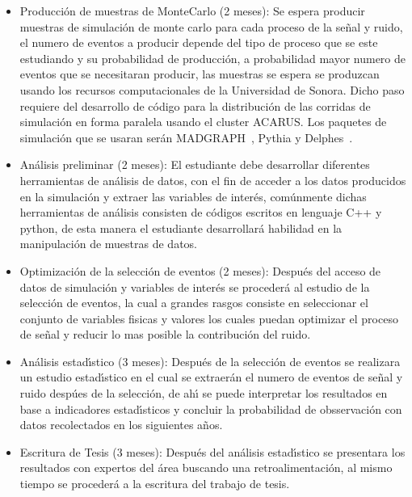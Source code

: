 \begin{itemize}
  
\item Producci\'on de muestras de MonteCarlo (2 meses): Se espera producir muestras de simulaci\'on de monte carlo para cada proceso de la se\~nal y ruido, el numero de eventos a producir depende del tipo de proceso que se este estudiando y su probabilidad de producci\'on, a probabilidad mayor numero de eventos que se necesitaran producir, las muestras se espera se produzcan usando los recursos computacionales de la Universidad de Sonora. Dicho paso requiere del desarrollo de c\'odigo para la distribuci\'on de las corridas de simulaci\'on en forma paralela usando el cluster ACARUS. Los paquetes de simulaci\'on que se usaran ser\'an MADGRAPH~\cite{Alwall:2007st}, Pythia y Delphes~\cite{deFavereau2014}.

\item An\'alisis preliminar (2 meses): El estudiante debe desarrollar diferentes herramientas de an\'alisis de datos, con el fin de acceder a los datos producidos en la simulaci\'on y extraer las variables de inter\'es, com\'unmente dichas herramientas de an\'alisis consisten de c\'odigos escritos en lenguaje C++ y python, de esta manera el estudiante desarrollar\'a habilidad en la manipulaci\'on de muestras de datos. 

\item Optimizaci\'on de la selecci\'on de eventos (2 meses): Despu\'es del acceso de datos de simulaci\'on y variables de inter\'es se proceder\'a al estudio de la selecci\'on de eventos, la cual a grandes rasgos consiste en seleccionar el conjunto de variables fisicas y valores los cuales puedan optimizar el proceso de se\~nal y reducir lo mas posible la contribuci\'on del ruido. 

\item An\'alisis estad\'{\i}stico (3 meses): Despu\'es de la selecci\'on de eventos se realizara un estudio estad\'{\i}stico en el cual se extraer\'an el numero de eventos de se\~nal y ruido desp\'ues de la selecci\'on, de ah\'{\i} se puede interpretar los resultados en base a indicadores estad\'{\i}sticos y concluir la probabilidad de obsservaci\'on con datos recolectados en los siguientes a\~nos.

\item Escritura de Tesis (3 meses): Despu\'es del an\'alisis estad\'{\i}stico se presentara los resultados con expertos del \'area buscando una retroalimentaci\'on, al mismo tiempo se proceder\'a a la escritura del trabajo de tesis. 

\end{itemize}
  
